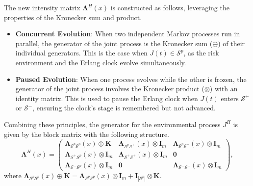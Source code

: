 \documentclass[11pt]{article}
\numberwithin{table}{section}
\numberwithin{figure}{section}
\numberwithin{equation}{section}
\newcommand{\1}{{\mathbf 1}}
\newcommand{\0}{\mat{0}}
\begin{document}
The new intensity matrix \(\bm{\Lambda}^H(x)\) is constructed as follows, leveraging the properties of the Kronecker sum and product.
\begin{itemize}
    \item \textbf{Concurrent Evolution}: When two independent Markov processes run in parallel, the generator of the joint process is the Kronecker sum (\(\oplus\)) of their individual generators. This is the case when \(J(t) \in \mathcal{S}^p\), as the risk environment and the Erlang clock evolve simultaneously.
    \item \textbf{Paused Evolution}: When one process evolves while the other is frozen, the generator of the joint process involves the Kronecker product (\(\otimes\)) with an identity matrix. This is used to pause the Erlang clock when \(J(t)\) enters \(\mathcal{S}^+\) or \(\mathcal{S}^-\), ensuring the clock's stage is remembered but not advanced.
\end{itemize}
Combining these principles, the generator for the environmental process \(J^H\) is given by the block matrix with the following structure.
\[
\bm{\Lambda}^H(x) =
\begin{pmatrix}
\bm{\Lambda}_{\mathcal{S}^p\mathcal{S}^p}(x) \oplus \bm{K} & \bm{\Lambda}_{\mathcal{S}^p\mathcal{S}^+}(x) \otimes \bm{I}_m & \bm{\Lambda}_{\mathcal{S}^p\mathcal{S}^-}(x) \otimes \bm{I}_m \\
\bm{\Lambda}_{\mathcal{S}^+\mathcal{S}^p}(x) \otimes \bm{I}_m & \bm{\Lambda}_{\mathcal{S}^+\mathcal{S}^+}(x) \otimes \bm{I}_m & \bm{0} \\
\bm{\Lambda}_{\mathcal{S}^-\mathcal{S}^p}(x) \otimes \bm{I}_m & \bm{0} & \bm{\Lambda}_{\mathcal{S}^-\mathcal{S}^-}(x) \otimes \bm{I}_m
\end{pmatrix},
\]
where \(\bm{\Lambda}_{\mathcal{S}^p\mathcal{S}^p}(x) \oplus \bm{K} = \bm{\Lambda}_{\mathcal{S}^p\mathcal{S}^p}(x) \otimes \bm{I}_m + \bm{I}_{|\mathcal{S}^p|} \otimes \bm{K}\).
\end{document}
